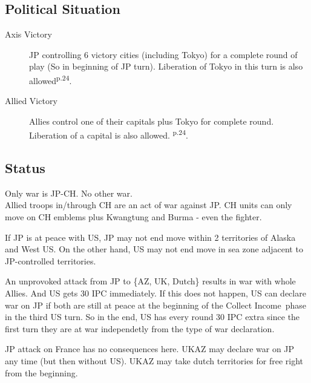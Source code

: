 \documentclass[10pt,a4paper,landscape]{article}
\begin{document}
\pagebreak
\begin{multicols*}{3}
\section*{Political Situation}
\begin{description}
\item[Axis Victory] JP controlling 6 victory cities (including Tokyo) for a complete round of play (So in beginning of JP turn). Liberation of Tokyo in this turn is also allowed\textsuperscript{p.24}.
\item[Allied Victory] Allies control one of their capitals plus Tokyo for complete round. Liberation  of a capital is also allowed. \textsuperscript{p.24}.
\end{description}

\subsection*{Status}
Only war is JP-CH. No other war.\\
Allied troops in/through CH are an act of war against JP. CH units can only move on CH emblems plus Kwangtung and Burma - even the fighter.

If JP is at peace with US, JP may not end move within 2 territories of Alaska and West US. On the other hand, US may not end move in sea zone adjacent to JP-controlled territories. 

An unprovoked attack from JP to \{AZ, UK, Dutch\} results in war with whole Allies. And US gets 30 IPC immediately. If this does not happen, US can declare war on JP if both are still at peace at the beginning of the \glqq Collect Income\grqq\ phase in the third US turn. So in the end, US has every round 30 IPC extra since the first turn they are at war independetly from the type of war declaration.

JP attack on France has no consequences here. UKAZ may declare war on JP any time (but then without US).
UKAZ may take dutch territories for free right from the beginning.

\columnbreak

\end{multicols*}
\end{document}
